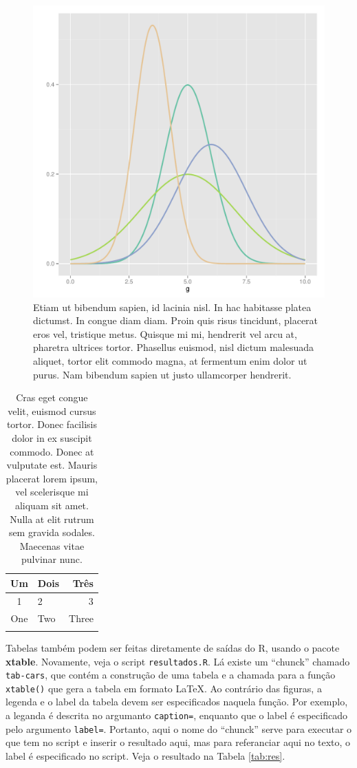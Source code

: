 \documentclass[book,A4paper,10pt,twoside,oldfontcommands]{memoir}\usepackage[]{graphicx}\usepackage[usenames,dvipsnames]{color}
\newenvironment{knitrout}{}{} %
\begin{document}
\begin{btUnit}
\begin{knitrout}
\color{fgcolor}\begin{figure}[htb]

{\centering \includegraphics[width=0.45\linewidth]{figuras/distributions} 

}

\caption[Etiam ut bibendum sapien, id lacinia nisl]{Etiam ut bibendum sapien, id lacinia nisl. In hac habitasse platea dictumst. In congue diam diam. Proin quis risus tincidunt, placerat eros vel, tristique metus. Quisque mi mi, hendrerit vel arcu at, pharetra ultrices tortor. Phasellus euismod, nisl dictum malesuada aliquet, tortor elit commodo magna, at fermentum enim dolor ut purus. Nam bibendum sapien ut justo ullamcorper hendrerit.}\label{fig:fig2}
\end{figure}


\end{knitrout}


\begin{table}
\centering
\caption{Cras eget congue velit, euismod cursus tortor. Donec
  facilisis dolor in ex suscipit commodo. Donec at vulputate est.
  Mauris placerat lorem ipsum, vel scelerisque mi aliquam sit amet.
  Nulla at elit rutrum sem gravida sodales. Maecenas vitae pulvinar
  nunc.}
\begin{tabular}{clr}
\hline
Um & Dois & Três\\
\hline
1 & 2 & 3 \\
One & Two & Three\\
\hline
\label{Tab:result}
\end{tabular}
\end{table}

Tabelas também podem ser feitas diretamente de saídas do R, usando o
pacote \textbf{xtable}. Novamente, veja o script \texttt{resultados.R}.
Lá existe um ``chunck'' chamado \texttt{tab-cars}, que contém a
construção de uma tabela e a chamada para a função \texttt{xtable()} que
gera a tabela em formato \LaTeX. Ao contrário das figuras, a legenda e o
label da tabela devem ser especificados naquela função. Por exemplo, a
leganda é descrita no argumanto \texttt{caption=}, enquanto que o label
é especificado pelo argumento \texttt{label=}. Portanto, aqui o nome do
``chunck'' serve para executar o que tem no script e inserir o resultado
aqui, mas para referanciar aqui no texto, o label é especificado no
script. Veja o resultado na Tabela \ref{tab:res}.


\end{btUnit}
\end{document}
